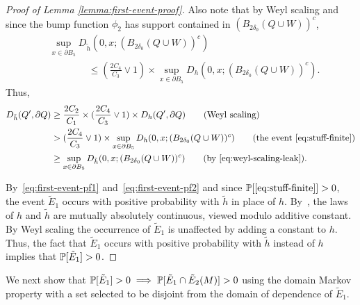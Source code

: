 \documentclass[12pt]{amsart}
\numberwithin{equation}{section}
\begin{document}
\begin{proof}[Proof of Lemma \ref{lemma:first-event-proof}]
		Also note that by Weyl scaling and since the bump function $\phi_2$ has support contained in $(B_{2 \delta_0}(Q \cup W))^c$,
		\begin{equation} \label{eq:weyl-scaling-leak}
		\begin{aligned}
		&\sup_{x \in \partial B_{5}} D_{\tilde h}(0, x; (B_{2 \delta_0}(Q \cup W))^c)  \\
		&\qquad\qquad\leq (\frac{2 C_4}{C_3} \vee 1) \times  \sup_{x \in \partial B_{5}} D_{h}(0, x; (B_{2 \delta_0}(Q \cup W))^c).
		\end{aligned}
		\end{equation}
		Thus, 
		\begin{align}  \label{eq:first-event-pf2}
		D_{\tilde h}(Q', \partial Q) &\geq \frac{2 C_2}{C_1} \times (\frac{2 C_4}{C_3} \vee 1) \times D_{h}(Q', \partial Q) \qquad \mbox{(Weyl scaling)}  \notag \\
		&> (\frac{2 C_4}{C_3} \vee 1) \times \sup_{x \in \partial B_{5}} D_{h}(0, x; (B_{2 \delta_0}(Q \cup W))^c)  \qquad \mbox{(the event \eqref{eq:stuff-finite})}  \notag \\
		&\geq \sup_{x \in \partial B_{5}} D_{\tilde h}(0, x; (B_{2 \delta_0}(Q \cup W))^c) \qquad \mbox{(by \eqref{eq:weyl-scaling-leak})}.
		\end{align}
		
		By~\eqref{eq:first-event-pf1} and~\eqref{eq:first-event-pf2} and since $\P[\eqref{eq:stuff-finite}] > 0$, the event $\tilde E_1$ occurs with positive probability with $\tilde h$ in place of $h$. 
		By~\cite[Proposition 2.9]{miller2017imaginary}, the laws of $h$ and $\tilde h$ are mutually absolutely continuous, viewed modulo additive constant. By Weyl scaling the occurrence of $\tilde E_1$ is unaffected by adding a constant to $h$.
		Thus, the fact that $\tilde E_1$ occurs with positive probability with $\tilde h$ instead of $h$ implies that $\P[\tilde E_1] > 0$.   
	\end{proof}
	
	
	We next show that $\P[\tilde E_1] > 0 \implies \P[\tilde E_1 \cap \tilde E_2(M)] > 0$ using the domain Markov property
	with a set selected to be disjoint from the domain of dependence of $\tilde E_1$. 
	
\end{document}
